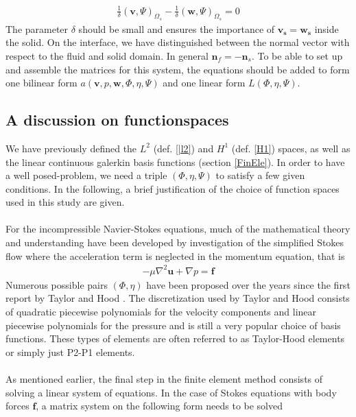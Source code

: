 \begin{align}
\frac{1}{\delta}(\mathbf{v},\Psi)_{\Omega_s} - \frac{1}{\delta}(\mathbf{w},\Psi)_{\Omega_s} = 0 \label{VarMesh2}
\end{align}
The parameter $\delta $ should be small and ensures the importance of $\mathbf{v_s} = \mathbf{w_s}$ inside the solid. On the interface, we have distinguished between the normal vector with respect to the fluid and solid domain. In general $\mathbf{n}_f = -\mathbf{n}_s$. To be able to set up and assemble the matrices for this system, the equations should be added to form one bilinear form $a(\mathbf{v},p,\mathbf{w},\Phi,\eta,\Psi)$ and one linear form $L(\Phi,\eta,\Psi)$.



 
\subsection{A discussion on functionspaces}
We have previously defined the $L^2$ (def. \ref{|l2}) and $H^1$ (def. \ref{H1}) spaces, as well as the linear continuous galerkin basis functions (section \ref{FinEle}). In order to have a well posed-problem, we need a triple $(\Phi,\eta, \Psi)$ to satisfy a few given conditions. In the following, a brief justification of the choice of function spaces used in this study are given. \\
\\
For the incompressible Navier-Stokes equations, much of the mathematical theory and understanding have been developed by investigation of the simplified Stokes flow where the acceleration term is neglected in the momentum equation, that is
\begin{align}
-\mu\nabla^2\mathbf{u} + \nabla p = \mathbf{f}
\end{align} Numerous possible pairs $(\Phi, \eta)$ have been proposed over the years since the first report by Taylor and Hood \cite{Tayl73}. The discretization used by Taylor and Hood consists of quadratic piecewise polynomials for the velocity components and linear piecewise polynomials for the pressure and is still a very popular choice of basis functions. These types of elements are often referred to as Taylor-Hood elements or simply just P2-P1 elements. 
\\
\\
As mentioned earlier, the final step in the finite element method consists of solving a linear system of equations. In the case of Stokes equations with body forces $\mathbf{f}$, a matrix system on the following form needs to be solved
